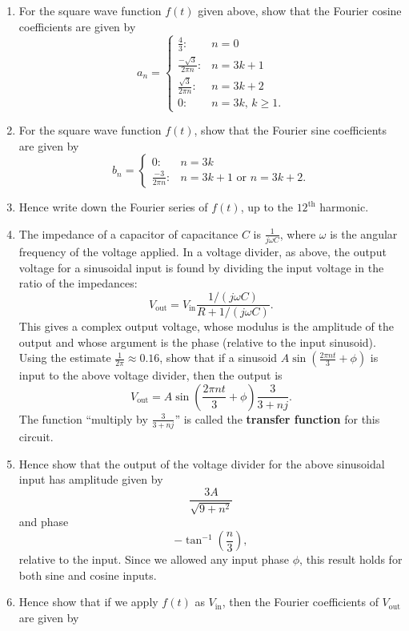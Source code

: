 \documentclass{article}
\begin{document}
\clearpage


\begin{enumerate}
	\item For the square wave function $f(t)$ given above, show that the Fourier cosine coefficients are given by
		\[a_n=\begin{cases}
				\frac{4}{3}: & n=0\\
				\frac{-\sqrt{3}}{2\pi n}: & n=3k+1\\
				\frac{\sqrt{3}}{2\pi n}: & n=3k+2\\
				0: & n=3k,\, k\geq 1.
			\end{cases}\]
	\item For the square wave function $f(t)$, show that the Fourier sine coefficients are given by
		\[b_n=\begin{cases}
				0: & n=3k\\
				\frac{-3}{2\pi n}: & n=3k+1\mbox{ or } n=3k+2.
			\end{cases}\]
	\item Hence write down the Fourier series of $f(t)$, up to the $12^\mathrm{th}$ harmonic.
	\item The impedance of a capacitor of capacitance $C$ is $\frac{1}{j\omega C}$, where $\omega$ is the angular frequency of the voltage applied. In a voltage divider, as above, the output voltage for a sinusoidal input is found by dividing the input voltage in the ratio of the impedances:
		\[V_\mathrm{out}=V_\mathrm{in}\frac{1/(j\omega C)}{R+1/(j\omega C)}.\]
		This gives a complex output voltage, whose modulus is the amplitude of the output and whose argument is the phase (relative to the input sinusoid). Using the estimate $\frac{1}{2\pi}\approx 0.16$, show that if a sinusoid $A\sin\left(\frac{2\pi nt}{3} +\phi\right)$ is input to the above voltage divider, then the output is
		\[V_\mathrm{out}=A\sin\left(\frac{2\pi nt}{3}+\phi\right)\frac{3}{3+nj}.\]
		The function ``multiply by $\frac{3}{3+nj}$'' is called the \textbf{transfer function} for this circuit.
	\item Hence show that the output of the voltage divider for the above sinusoidal input has amplitude given by
		\[\frac{3A}{\sqrt{9+n^2}}\]
		and phase
		\[-\tan^{-1}\left(\frac{n}{3}\right),\]
		relative to the input. Since we allowed any input phase $\phi$, this result holds for both sine and cosine inputs.
	\item Hence show that if we apply $f(t)$ as $V_\mathrm{in}$, then the Fourier coefficients of $V_\mathrm{out}$ are given by
		\begin{align*}

\end{align*}
\end{enumerate}
\end{document}
